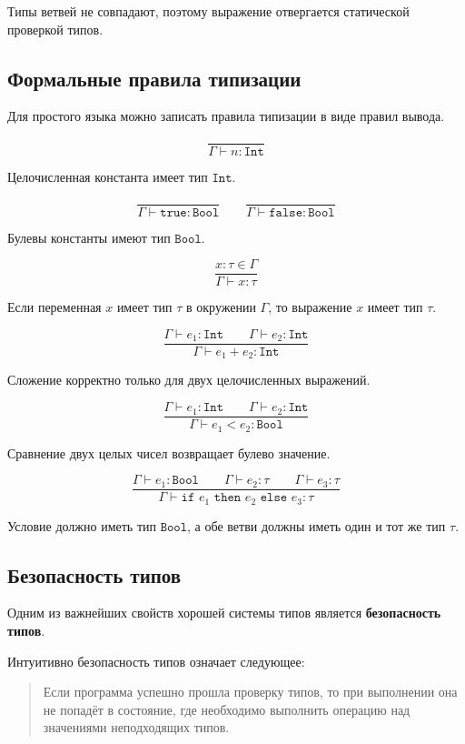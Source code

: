 \documentclass[12pt,a4paper]{article}
\begin{document}
Типы ветвей не совпадают, поэтому выражение отвергается статической проверкой типов.

\subsection{Формальные правила типизации}

Для простого языка можно записать правила типизации в виде правил вывода.

\[
\frac{}{\Gamma \vdash n : \texttt{Int}}
\]

Целочисленная константа имеет тип \(\texttt{Int}\).

\[
\frac{}{\Gamma \vdash \texttt{true} : \texttt{Bool}}
\qquad
\frac{}{\Gamma \vdash \texttt{false} : \texttt{Bool}}
\]

Булевы константы имеют тип \(\texttt{Bool}\).

\[
\frac{x : \tau \in \Gamma}{\Gamma \vdash x : \tau}
\]

Если переменная \(x\) имеет тип \(\tau\) в окружении \(\Gamma\), то выражение \(x\)
имеет тип \(\tau\).

\[
\frac{\Gamma \vdash e_1 : \texttt{Int}
\qquad
\Gamma \vdash e_2 : \texttt{Int}}
{\Gamma \vdash e_1 + e_2 : \texttt{Int}}
\]

Сложение корректно только для двух целочисленных выражений.

\[
\frac{\Gamma \vdash e_1 : \texttt{Int}
\qquad
\Gamma \vdash e_2 : \texttt{Int}}
{\Gamma \vdash e_1 < e_2 : \texttt{Bool}}
\]

Сравнение двух целых чисел возвращает булево значение.

\[
\frac{
\Gamma \vdash e_1 : \texttt{Bool}
\qquad
\Gamma \vdash e_2 : \tau
\qquad
\Gamma \vdash e_3 : \tau
}
{
\Gamma \vdash \texttt{if } e_1 \texttt{ then } e_2 \texttt{ else } e_3 : \tau
}
\]

Условие должно иметь тип \(\texttt{Bool}\), а обе ветви должны иметь один и тот же
тип \(\tau\).

\subsection{Безопасность типов}

Одним из важнейших свойств хорошей системы типов является \textbf{безопасность типов}.

Интуитивно безопасность типов означает следующее:

\begin{quote}
Если программа успешно прошла проверку типов, то при выполнении она не попадёт в
состояние, где необходимо выполнить операцию над значениями неподходящих типов.
\end{quote}
\end{document}
